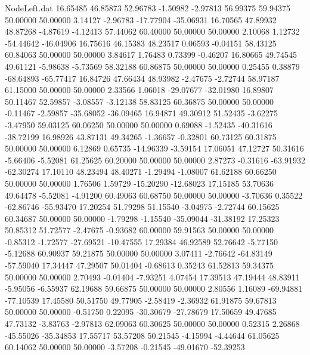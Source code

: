 \begin{filecontents}{NodeLeft.dat}
  16.65485   46.85873   52.96783    -1.50982   -2.97813   56.99375   59.94375   50.00000   50.00000    3.14127   -2.96783  -17.77904  -35.06931
  16.70565   47.89932   48.87268    -4.87619   -4.12413   57.44062   60.40000   50.00000   50.00000    2.10068    1.12732  -54.44642  -46.04906
  16.75616   46.15383   48.23517     0.06593   -0.04151   58.43125   60.84063   50.00000   50.00000    3.84617    1.76483    0.73399   -0.46207
  16.80665   49.74545   49.61121    -5.98638   -5.73569   58.32188   60.86875   50.00000   50.00000    0.25455    0.38879  -68.64893  -65.77417
  16.84726   47.66434   48.93982    -2.47675   -2.72744   58.97187   61.15000   50.00000   50.00000    2.33566    1.06018  -29.07677  -32.01980
  16.89807   50.11467   52.59857    -3.08557   -3.12138   58.83125   60.36875   50.00000   50.00000   -0.11467   -2.59857  -35.68052  -36.09465
  16.94871   49.30912   51.52435    -3.62275   -3.47950   59.03125   60.06250   50.00000   50.00000    0.69088   -1.52435  -40.31616  -38.72199
  16.98926   43.87131   49.34265    -1.36657   -0.32801   60.73125   60.31875   50.00000   50.00000    6.12869    0.65735  -14.96339   -3.59154
  17.06051   47.12727   50.31616    -5.66406   -5.52081   61.25625   60.20000   50.00000   50.00000    2.87273   -0.31616  -63.91932  -62.30274
  17.10110   48.23494   48.40271    -1.29494   -1.08007   61.62188   60.66250   50.00000   50.00000    1.76506    1.59729  -15.20290  -12.68023
  17.15185   53.70636   49.64478    -5.52081   -4.91200   60.49063   60.68750   50.00000   50.00000   -3.70636    0.35522  -62.86746  -55.93470
  17.20254   51.79298   51.15540    -3.04975   -2.72744   60.15625   60.34687   50.00000   50.00000   -1.79298   -1.15540  -35.09044  -31.38192
  17.25323   50.85312   51.72577    -2.47675   -0.93682   60.00000   59.91563   50.00000   50.00000   -0.85312   -1.72577  -27.69521  -10.47555
  17.29384   46.92589   52.76642    -5.77150   -5.12688   60.90937   59.21875   50.00000   50.00000    3.07411   -2.76642  -64.83149  -57.59040
  17.34447   47.29507   50.01404    -0.68613    0.35243   61.52813   59.34375   50.00000   50.00000    2.70493   -0.01404   -7.93251    4.07454
  17.39513   47.19444   48.83911    -5.95056   -6.55937   62.19688   59.66875   50.00000   50.00000    2.80556    1.16089  -69.94881  -77.10539
  17.45580   50.51750   49.77905    -2.58419   -2.36932   61.91875   59.67813   50.00000   50.00000   -0.51750    0.22095  -30.30679  -27.78679
  17.50659   49.47685   47.73132    -3.83763   -2.97813   62.09063   60.30625   50.00000   50.00000    0.52315    2.26868  -45.55026  -35.34853
  17.55717   53.57208   50.21545    -4.15994   -4.44644   61.05625   60.14062   50.00000   50.00000   -3.57208   -0.21545  -49.01670  -52.39253

\end{filecontents}
